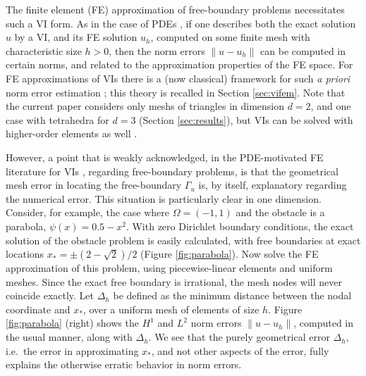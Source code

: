 \documentclass[]{interact}
\theoremstyle{plain}%
\theoremstyle{definition}
\theoremstyle{remark}
\begin{document}
The finite element (FE) approximation of free-boundary problems necessitates such a VI form.  As in the case of PDEs \cite{ElmanSilvesterWathen2014}, if one describes both the exact solution $u$ by a VI, and its FE solution $u_h$, computed on some finite mesh with characteristic size $h>0$, then the norm errors $\|u-u_h\|$ can be computed in certain norms, and related to the approximation properties of the FE space.  For FE approximations of VIs there is a (now classical) framework for such \emph{a priori} norm error estimation \cite{Falk1974}; this theory is recalled in Section \ref{sec:vifem}.  Note that the current paper considers only meshs of triangles in dimension $d=2$, and one case with tetrahedra for $d=3$ (Section \ref{sec:results}), but VIs can be solved with higher-order elements as well \cite{KeithSurowiec2024}. 

However, a point that is weakly acknowledged, in the PDE-motivated FE literature for VIs \cite[for example]{Suttmeier2008}, regarding free-boundary problems, is that the geometrical mesh error in locating the free-boundary $\Gamma_u$ is, by itself, explanatory regarding the numerical error.  This situation is particularly clear in one dimension.  Consider, for example, the case where $\Omega = (-1,1)$ and the obstacle is a parabola, $\psi(x)=0.5 - x^2$.  With zero Dirichlet boundary conditions, the exact solution of the obstacle problem is easily calculated, with free boundaries at exact locations $x_*=\pm(2-\sqrt{2})/2$ (Figure \ref{fig:parabola}).  Now solve the FE approximation of this problem, using piecewise-linear elements and uniform meshes.  Since the exact free boundary is irrational, the mesh nodes will never coincide exactly.  Let $\Delta_h$ be defined as the minimum distance between the nodal coordinate and $x_*$, over a uniform mesh of elements of size $h$.  Figure \ref{fig:parabola} (right) shows the $H^1$ and $L^2$ norm errors $\|u-u_h\|$, computed in the usual manner, along with $\Delta_h$.  We see that the purely geometrical error $\Delta_h$, i.e.~the error in approximating $x_*$, and not other aspects of the error, fully explains the otherwise erratic behavior in norm errors.
\end{document}
